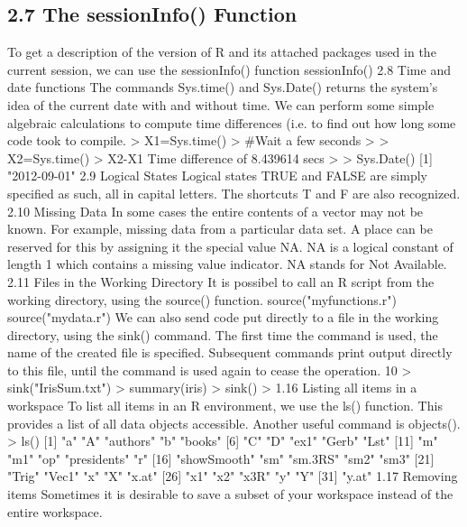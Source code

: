 \subsection{2.7 The sessionInfo() Function}
To get a description of the version of R and its attached packages used in the current session,
we can use the sessionInfo() function
sessionInfo()
2.8 Time and date functions
The commands Sys.time() and Sys.Date() returns the system's idea of the current date
with and without time. We can perform some simple algebraic calculations to compute time
differences (i.e. to find out how long some code took to compile.
> X1=Sys.time()
> #Wait a few seconds
>
> X2=Sys.time()
> X2-X1 Time difference of 8.439614 secs
>
> Sys.Date() [1] "2012-09-01"
2.9 Logical States
Logical states TRUE and FALSE are simply specified as such, all in capital letters. The
shortcuts T and F are also recognized.
2.10 Missing Data
In some cases the entire contents of a vector may not be known. For example, missing data
from a particular data set. A place can be reserved for this by assigning it the special value
NA.
NA is a logical constant of length 1 which contains a missing value indicator. NA stands
for Not Available.
2.11 Files in the Working Directory
It is possibel to call an R script from the working directory, using the source() function.
source("myfunctions.r")
source("mydata.r")
We can also send code put directly to a file in the working directory, using the sink()
command. The first time the command is used, the name of the created file is specified.
Subsequent commands print output directly to this file, until the command is used again to
cease the operation.
10
> sink("IrisSum.txt")
> summary(iris)
> sink()
>
1.16 Listing all items in a workspace
To list all items in an R environment, we use the ls() function. This provides a list of all data
objects accessible. Another useful command is objects().
> ls()
[1] "a" "A" "authors" "b" "books"
[6] "C" "D" "ex1" "Gerb" "Lst"
[11] "m" "m1" "op" "presidents" "r"
[16] "showSmooth" "sm" "sm.3RS" "sm2" "sm3"
[21] "Trig" "Vec1" "x" "X" "x.at"
[26] "x1" "x2" "x3R" "y" "Y"
[31] "y.at"
1.17 Removing items
Sometimes it is desirable to save a subset of your workspace instead of the entire workspace.
